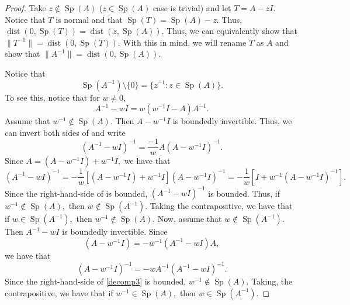 \documentclass[12pt,a4paper]{article}
\newcommand{\Sp}[1]{\operatorname{Sp}\!\left(#1\right)}
\theoremstyle{boldthm}
\theoremstyle{bolddefn}
\begin{document}
\begin{proof}
Take $z \notin \Sp{A}$ ($z \in \Sp{A}$ case is trivial) and let $T = A-zI.$ Notice that $T$ is normal and that $\Sp{T} = \Sp{A} - z.$ Thus, $\operatorname{dist}(0, \Sp{T}) = \operatorname{dist}(z, \Sp{A}).$ Thus, we can equivalently show that $\|T^{-1}\| = \operatorname{dist}(0, \Sp{T}).$ With this in mind, we will rename $T$ as $A$ and show that $\|A^{-1}\| = \operatorname{dist}(0, \Sp{A}).$ 

Notice that
\begin{equation} \label{factor}
    \Sp{A^{-1}} \setminus \{0\} = \{ z^{-1} : z \in \Sp{A} \}.
\end{equation}
To see this, notice that for $w \ne 0,$
\begin{equation}\label{decomp}
    A^{-1} - w I = w( w^{-1} I - A)A^{-1}.
\end{equation}
Assume that $w^{-1} \notin \Sp{A}.$ Then $A-w^{-1}I$ is boundedly invertible. Thus, we can invert both sides of  and write
\begin{equation}
    (A^{-1} - wI)^{-1} = \frac{-1}{w} A (A-w^{-1} I)^{-1}.
\end{equation}
Since $A = (A-w^{-1}I) + w^{-1} I,$ we have that
\begin{equation}\label{decomp2}
    (A^{-1} - wI)^{-1} = -\frac{1}{w} [ (A-w^{-1} I) + w^{-1} I] (A-w^{-1} I)^{-1} = -\frac{1}{w} [ I + w^{-1}(A-w^{-1}I)^{-1}].
\end{equation}
Since the right-hand-side of  is bounded, $(A^{-1} - wI)^{-1}$ is bounded. Thus, if $w^{-1} \notin \Sp{A},$ then $w \notin \Sp{A^{-1}}.$ Taking the contrapositive, we have that if $w \in \Sp{A^{-1}},$ then $w^{-1} \notin \Sp{A}.$
Now, assume that $w \notin \Sp{A^{-1}}.$ Then $A^{-1} - wI$ is boundedly invertible. Since 
\begin{equation}
    (A-w^{-1}I) = -w^{-1}(A^{-1} - wI) A,
\end{equation}
we have that 
\begin{equation}\label{decomp3}
    (A-w^{-1}I)^{-1} = -w A^{-1} (A^{-1} - wI)^{-1}.
\end{equation}
Since the right-hand-side of \eqref{decomp3} is bounded, $w^{-1} \notin \Sp{A}.$ Taking, the contrapositive, we have that if $w^{-1} \in \Sp{A},$ then $w \in \Sp{A^{-1}}.$


\end{proof}
\end{document}
